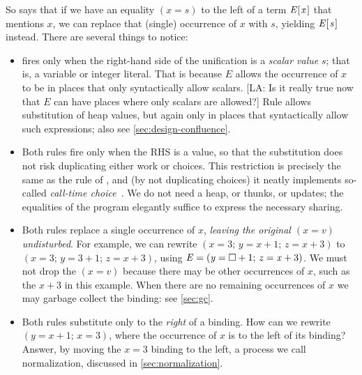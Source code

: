 \documentclass[acmsmall,review,anonymous,dvipsnames]{acmart}
\newcommand{\Conid}[1]{\mathit{#1}}
\newcommand{\Varid}[1]{\mathit{#1}}
\newcommand{\lennart}[1]{{\color{dkcyan} [{LA}: #1]}}
\newcommand{\lennart}[1]{}
\begin{document}
So  says that if we have an equality \ensuremath{(\Varid{x}\mathrel{=}\Varid{s})} to the left of a term \ensuremath{\Conid{E} [\mskip1.5mu \Varid{x}\mskip1.5mu]} that
mentions \ensuremath{\Varid{x}}, we can replace that (single) occurrence of \ensuremath{\Varid{x}} with \ensuremath{\Varid{s}}, yielding \ensuremath{\Conid{E} [\mskip1.5mu \Varid{s}\mskip1.5mu]} instead.
There are several things to notice:
\begin{itemize}
\item {} fires only when the right-hand side of the unification is a \emph{scalar value} \ensuremath{\Varid{s}};
  that is, a variable or integer literal. That is because \ensuremath{\Conid{E}} allows the occurrence of \ensuremath{\Varid{x}} to be
  in places that only syntactically allow scalars. \lennart{Is it really true now that \ensuremath{\Conid{E}} can have places where only scalars are allowed?} Rule  allows substitution of heap values, but
  again only in places that syntactically allow such expressions; also see \cref{sec:design-confluence}.
\item Both rules fire only when the RHS is a value, so that the substitution does not risk
  duplicating either work or choices. This
restriction is precisely the same as the  rule of \cite{ariola:call-by-need},
and (by not duplicating choices) it neatly implements so-called \emph{call-time choice}~\cite{hanus:survey}.
We do not need a heap, or thunks, or updates; the equalities of the program elegantly
suffice to express the necessary sharing.
\item Both  rules
  replace a single occurrence of \ensuremath{\Varid{x}}, \emph{leaving the original \ensuremath{(\Varid{x}\mathrel{=}\Varid{v})} undisturbed}.
  For example, we can rewrite \ensuremath{(\Varid{x}\mathrel{=}\mathrm{3};\,\Varid{y}\mathrel{=}\Varid{x}\mathbin{+}\mathrm{1};\,\Varid{z}\mathrel{=}\Varid{x}\mathbin{+}\mathrm{3})} to \ensuremath{(\Varid{x}\mathrel{=}\mathrm{3};\,\Varid{y}\mathrel{=}\mathrm{3}\mathbin{+}\mathrm{1};\,\Varid{z}\mathrel{=}\Varid{x}\mathbin{+}\mathrm{3})}, using
  \ensuremath{\Conid{E}\mathrel{=}(\Varid{y}\mathrel{=}\hole\mathbin{+}\mathrm{1};\,\Varid{z}\mathrel{=}\Varid{x}\mathbin{+}\mathrm{3})}.  We must not drop the \ensuremath{(\Varid{x}\mathrel{=}\Varid{v})} because there may be other occurrences of \ensuremath{\Varid{x}},
  such as the \ensuremath{\Varid{x}\mathbin{+}\mathrm{3}} in this example.  When there are no remaining occurrences of \ensuremath{\Varid{x}} we may garbage collect
  the binding: see \cref{sec:gc}.
\item Both rules substitute only to the \emph{right} of a binding.  How can we rewrite \ensuremath{(\Varid{y}\mathrel{=}\Varid{x}\mathbin{+}\mathrm{1};\,\Varid{x}\mathrel{=}\mathrm{3})},
  where the occurrence of \ensuremath{\Varid{x}} is to the left of its binding?
  Answer, by moving the \ensuremath{\Varid{x}\mathrel{=}\mathrm{3}} binding to the left, a process we call normalization, discussed in \cref{sec:normalization}.


\end{itemize}
\end{document}
